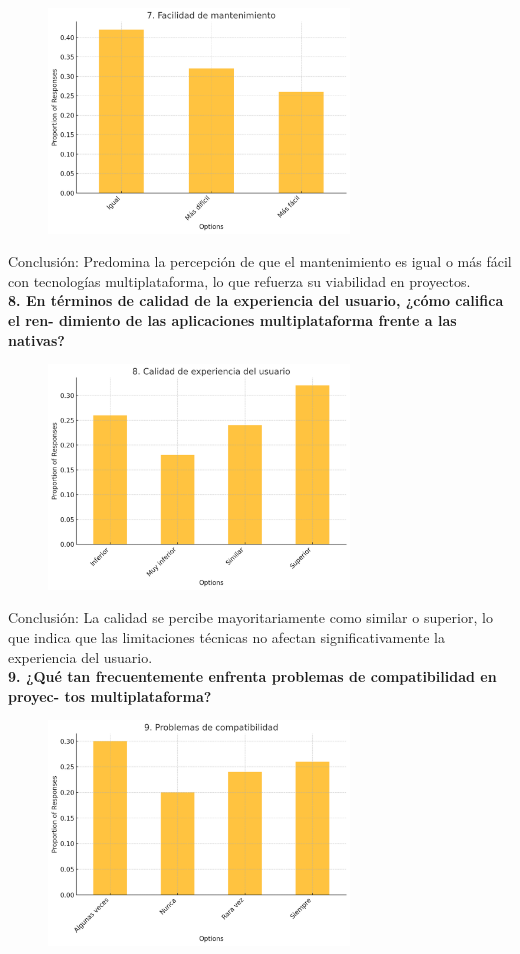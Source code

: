 \begin{figure}[h!]
    \includegraphics[width=8cm]{images/question7.png}
    \centering
\end{figure}

Conclusión: Predomina la percepción de que el mantenimiento es igual o más fácil con tecnologías multiplataforma, lo que refuerza su viabilidad en proyectos.\\

\textbf{8. En términos de calidad de la experiencia del usuario, ¿cómo califica el ren-
dimiento de las aplicaciones multiplataforma frente a las nativas?}

\begin{figure}[h!]
    \includegraphics[width=8cm]{images/question8.png}
    \centering
\end{figure}

Conclusión: La calidad se percibe mayoritariamente como similar o superior, lo que indica que las limitaciones técnicas no afectan significativamente la experiencia del usuario.\\

\newpage
\textbf{9. ¿Qué tan frecuentemente enfrenta problemas de compatibilidad en proyec-
tos multiplataforma?}

\begin{figure}[h!]
    \includegraphics[width=8cm]{images/question9.png}
    \centering
\end{figure}

